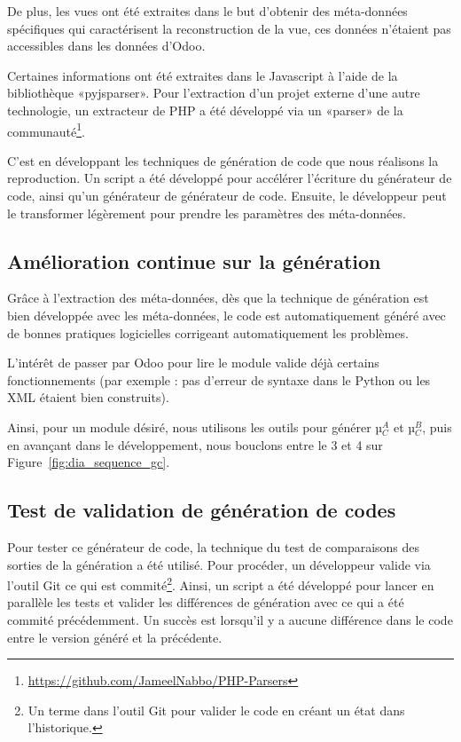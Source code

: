 De plus, les vues ont été extraites dans le but d'obtenir des méta-données spécifiques qui caractérisent la reconstruction de la vue, ces données n’étaient pas accessibles dans les données d'Odoo.

Certaines informations ont été extraites dans le Javascript à l’aide de la bibliothèque «pyjsparser». Pour l’extraction d'un projet externe d'une autre technologie, un extracteur de PHP a été développé via un «parser» de la communauté\footnote{\url{https://github.com/JameelNabbo/PHP-Parsers}}.

C'est en développant les techniques de génération de code que nous réalisons la reproduction. Un script a été développé pour accélérer l’écriture du générateur de code, ainsi qu'un générateur de générateur de code. Ensuite, le développeur peut le transformer légèrement pour prendre les paramètres des méta-données.

\subsection {Amélioration continue sur la génération}

Grâce à l’extraction des méta-données, dès que la technique de génération est bien développée avec les méta-données, le code est automatiquement généré avec de bonnes pratiques logicielles corrigeant automatiquement les problèmes.

L’intérêt de passer par Odoo pour lire le module valide déjà certains fonctionnements (par exemple : pas d’erreur de syntaxe dans le Python ou les XML étaient bien construits).

Ainsi, pour un module désiré, nous utilisons les outils pour générer µ$_C^A$ et µ$_C^B$, puis en avançant dans le développement, nous bouclons entre le 3 et 4 sur Figure~\ref{fig:dia_sequence_gc}.

\subsection {Test de validation de génération de codes}\label{test_validation_generation_code_resultat}

Pour tester ce générateur de code, la technique du test de comparaisons des sorties de la génération a été utilisé. Pour procéder, un développeur valide via l'outil Git ce qui est commité\footnote{Un terme dans l'outil Git pour valider le code en créant un état dans l'historique.}. Ainsi, un script a été développé pour lancer en parallèle les tests et valider les différences de génération avec ce qui a été commité précédemment. Un succès est lorsqu'il y a aucune différence dans le code entre le version généré et la précédente.

